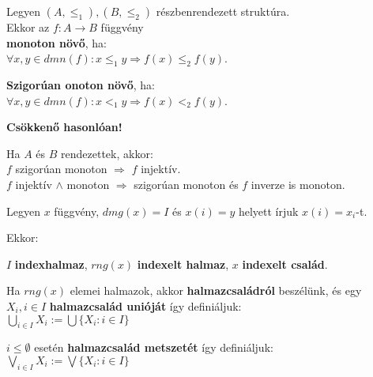 \documentclass{beamer}
\newcommand{\msmallskip}{\vspace{0.3em}}
\newcommand{\mmedskip}{\vspace{0.5em}}
\begin{document}
\begin{frame}
\begin{tcolorbox}[title={Def.: Monoton, Szigorúan monoton függvények}]
Legyen $(A, {\leq}_1), (B, {\leq}_2)$ részbenrendezett struktúra.\\
Ekkor az $f : A \rightarrow B$ függvény\\
\textbf{monoton növő}, ha:\\
${\forall}x, y \in dmn(f) : x {\leq}_1 y \Rightarrow f(x) {\leq}_2 f(y)$.\\
\mmedskip

\textbf{Szigorúan onoton növő}, ha:\\
${\forall}x, y \in dmn(f) : x <_1 y \Rightarrow f(x) <_2 f(y)$.\\
\mmedskip

\textbf{Csökkenő hasonlóan!}
\end{tcolorbox}

\begin{tcolorbox}[title={Ész}]
Ha $A$ és $B$ rendezettek, akkor:\\
$f$ szigorúan monoton $\Rightarrow$ $f$ injektív.\\
$f$ injektív $\land$ monoton $\Rightarrow$ szigorúan monoton és $f$ inverze is monoton.
\end{tcolorbox}
\end{frame}


\begin{frame}
\begin{tcolorbox}[title={Def.: Családok (Indexhalmaz, Indexelt halmaz, Indexelt család)}]
Legyen $x$ függvény, $dmg(x) = I$ és $x(i) = y$ helyett írjuk $x(i) = x_i$-t.\\
\mmedskip

Ekkor:\\
\msmallskip

$I$ \textbf{indexhalmaz}, $rng(x)$ \textbf{indexelt halmaz}, $x$ \textbf{indexelt család}.\\
\msmallskip

Ha $rng(x)$ elemei halmazok, akkor \textbf{halmazcsaládról} beszélünk, és egy $X_i, i \in I$ \textbf{halmazcsalád unióját} így definiáljuk:\\
${\bigcup}_{i \in I} X_i := {\bigcup}\{ X_i : i \in I\}$\\
\mmedskip

$i \leq \emptyset$ esetén \textbf{halmazcsalád metszetét} így definiáljuk:\\
${\bigvee}_{i \in I} X_i := {\bigvee}\{ X_i : i \in I\}$
\end{tcolorbox}
\end{frame}
\end{document}
